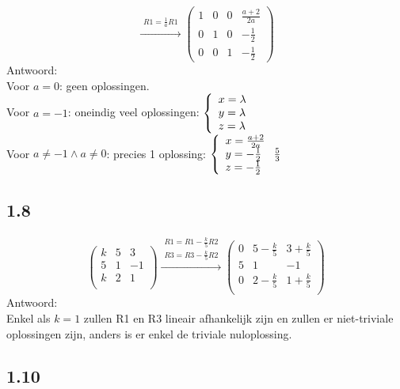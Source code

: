 \documentclass[11pt]{article}
\begin{document}
\[
\overset{\begin{matrix}
	R1=\frac{1}{a}R1
 \end{matrix}}{\rightarrow}
 \left(
\begin{array}{ccc|c}
1 & 0 & 0 & \frac{a+2}{2a} \\
0 & 1 & 0 & -\frac{1}{2} \\
0 & 0 & 1 & -\frac{1}{2}
\end{array}
\right)
\]
Antwoord:\\
Voor $a=0$: geen oplossingen.\\
Voor $a=-1$: oneindig veel oplossingen:
$
\left\{ 
  \begin{array}{l l}
    x=\lambda\\
	y=\lambda\\
	z=\lambda
  \end{array} \right.
$\\
Voor $a\neq-1\wedge a\neq0$: precies 1 oplossing:
$
\left\{ 
  \begin{array}{l l}
    x=\frac{a+2}{2a}\\
	y=-\frac{1}{2}\\
	z=-\frac{1}{2}
  \end{array} \right.
  \frac{5}{3}
$

\subsection*{1.8}
\[
\begin{pmatrix}
  k & 5 & 3 \\
  5 & 1 & -1 \\
  k & 2 & 1 \\
 \end{pmatrix}
 \overset{\begin{matrix}
  R1 = R1-\frac{k}{5}R2 \\
  R3 = R3-\frac{k}{5}R2
 \end{matrix}}{\rightarrow}
 \begin{pmatrix}
  0 & 5-\frac{k}{5} & 3+\frac{k}{5} \\
  5 & 1 & -1 \\
  0 & 2-\frac{k}{5} & 1+\frac{k}{5} \\
 \end{pmatrix}
\]
Antwoord:\\
Enkel als $k=1$ zullen R1 en R3 lineair afhankelijk zijn en zullen er niet-triviale oplossingen zijn, anders is er enkel de triviale nuloplossing.

\subsection*{1.10}
\end{document}
